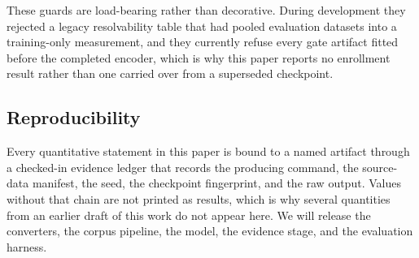 These guards are load-bearing rather than decorative. During development they rejected a legacy
resolvability table that had pooled evaluation datasets into a training-only measurement, and they
currently refuse every gate artifact fitted before the completed encoder, which is why this paper
reports no enrollment result rather than one carried over from a superseded checkpoint.

\subsection{Reproducibility}
\label{sec:reproducibility}

Every quantitative statement in this paper is bound to a named artifact through a checked-in evidence
ledger that records the producing command, the source-data manifest, the seed, the checkpoint
fingerprint, and the raw output. Values without that chain are not printed as results, which is why
several quantities from an earlier draft of this work do not appear here. We will release the
converters, the corpus pipeline, the model, the evidence stage, and the evaluation harness.
